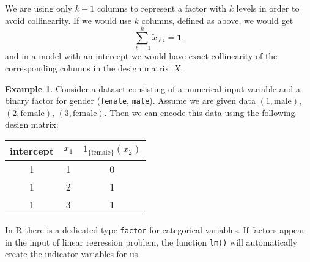 \documentclass[
  a4paper,
]{article}
\theoremstyle{definition}
\theoremstyle{definition}
\newtheorem{example}{Example}[section]
\theoremstyle{definition}
\theoremstyle{definition}
\theoremstyle{remark}
\begin{document}
We are using only \(k-1\) columns to represent a factor
with \(k\) levels in order to avoid collinearity. If we would use \(k\) columns,
defined as above, we would get
\begin{equation*}
  \sum_{\ell=1}^k \tilde x_{\ell i}
  = \mathbf{1},
\end{equation*}
and in a model with an intercept we would have exact collinearity of
the corresponding columns in the design matrix~\(X\).

\begin{example}

Consider a dataset consisting of a numerical input variable
and a binary factor for gender (\texttt{female}, \texttt{male}).
Assume we are given data
\((1, \mathrm{male})\), \((2, \mathrm{female})\), \((3, \mathrm{female})\).
Then we can encode this data using the following design matrix:

\begin{longtable}[]{@{}ccc@{}}
\toprule()
intercept & \(x_1\) & \(1_\mathrm{\{female\}}(x_2)\) \\
\midrule()
\endhead
1 & 1 & 0 \\
1 & 2 & 1 \\
1 & 3 & 1 \\
\bottomrule()
\end{longtable}

\end{example}

In R there is a dedicated type \texttt{factor} for categorical variables.
If factors appear in the input of linear regression problem, the
function \texttt{lm()} will automatically create the indicator variables
for us.
\end{document}
